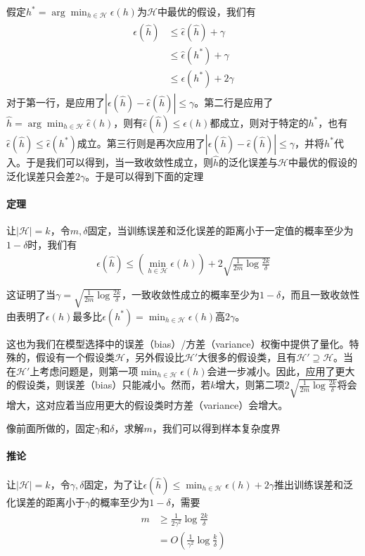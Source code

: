 假定$h^*=\arg\min_{h\in\mathcal{H}}\epsilon(h)$为$\mathcal{H}$中最优的假设，我们有
\begin{eqnarray}
\begin{aligned}
\epsilon(\hat{h})&\leq \hat{\epsilon}(\hat{h})+\gamma\\
&\leq \hat{\epsilon}(h^*)+\gamma\\
&\leq \epsilon(h^*)+2\gamma
\end{aligned}
\end{eqnarray}
对于第一行，是应用了$|\epsilon(\hat{h})-\hat{\epsilon}(\hat{h})|\leq \gamma$。第二行是应用了$\hat{h}=\arg\min_{h\in\mathcal{H}}\hat{\epsilon}(h)$，则有$\hat{\epsilon}(\hat{h})\leq \hat{\epsilon}(h)$都成立，则对于特定的$h^*$，也有$\hat{\epsilon}(\hat{h})\leq \hat{\epsilon}(h^*)$成立。第三行则是再次应用了$|\epsilon(\hat{h})-\hat{\epsilon}(\hat{h})|\leq \gamma$，并将$h^*$代入。于是我们可以得到，当一致收敛性成立，则$\hat{h}$的泛化误差与$\mathcal{H}$中最优的假设的泛化误差只会差$2\gamma$。于是可以得到下面的定理

\paragraph{定理}让$|\mathcal{H}|=k$，令$m,\delta$固定，当训练误差和泛化误差的距离小于一定值的概率至少为$1-\delta$时，我们有
\begin{eqnarray}
\epsilon(\hat{h})\leq \left( \min_{h\in\mathcal{H}}\epsilon(h) \right)+2\sqrt{\frac{1}{2m}\log\frac{2k}{\delta}}
\end{eqnarray}

这证明了当$\gamma=\sqrt{\frac{1}{2m}\log\frac{2k}{\delta}}$，一致收敛性成立的概率至少为$1-\delta$，而且一致收敛性由表明了$\epsilon(h)$最多比$\epsilon(h^*)=\min_{h\in\mathcal{H}}\epsilon(h)$高$2\gamma$。

这也为我们在模型选择中的误差（bias）/方差（variance）权衡中提供了量化。特殊的，假设有一个假设类$\mathcal{H}$，另外假设比$\mathcal{H}'$大很多的假设类，且有$\mathcal{H}'\supseteq\mathcal{H}$。当在$\mathcal{H}'$上考虑问题是，则第一项$\min_{h\in\mathcal{H}}\epsilon(h)$会进一步减小。因此，应用了更大的假设类，则误差（bias）只能减小。然而，若$k$增大，则第二项$2\sqrt{\frac{1}{2m}\log\frac{2k}{\delta}}$将会增大，这对应着当应用更大的假设类时方差（variance）会增大。

像前面所做的，固定$\gamma$和$\delta$，求解$m$，我们可以得到样本复杂度界
\paragraph{推论}让$|\mathcal{H}|=k$，令$\gamma,\delta$固定，为了让$\epsilon(\hat{h})\leq \min_{h\in\mathcal{H}}\epsilon(h)+2\gamma$推出训练误差和泛化误差的距离小于$\gamma$的概率至少为$1-\delta$，需要
\begin{eqnarray}
\begin{aligned}
m&\geq \frac{1}{2\gamma^2}\log\frac{2k}{\delta}\\
&=O\left( \frac{1}{\gamma^2}\log\frac{k}{\delta} \right)
\end{aligned}
\end{eqnarray}

